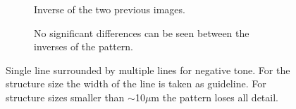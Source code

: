 \begin{figure}[!t]
\begin{subfigure}[t]{0.24\linewidth}
  	\centering
  	\caption{Inverse of the two previous images.}
  	\label{fig:b2d31_q32}
  \end{subfigure}
\hfill
     \begin{subfigure}[t]{0.24\linewidth}
  	\centering
  	\caption{No significant differences can be seen between the inverses of the pattern.}
  	\label{fig:b2d33_q34}
 \end{subfigure}
\caption{Single line surrounded by multiple lines for negative tone. For the structure size the width of the line is taken as guideline. For structure sizes smaller than $\sim$10$\mu$m the pattern loses all detail.}
 \end{figure}



